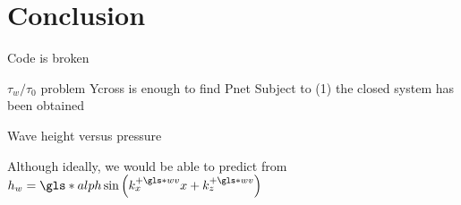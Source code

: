 \chapter{Conclusion}

Code is broken

$\tau_w/\tau_0$ problem
Ycross is enough to find Pnet
Subject to (1) the closed system has been obtained

Wave height versus pressure

Although ideally, we would be able to predict from $h_w=\gls*{alph}\sin \left( k_x\pw x + k_z\pw \right) $ 
